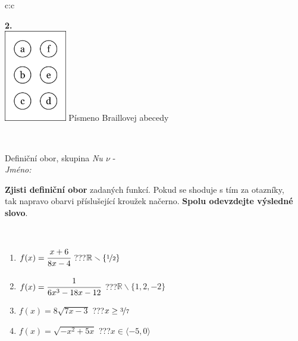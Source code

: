\documentclass[10pt]{report}
\begin{document}
\begin{tabular}{c:c}
\begin{minipage}[c][104.5mm][t]{0.5\linewidth}
\begin{center}
\begin{minipage}{0.20\linewidth}
\begin{center}
{\Huge\bfseries 2.} \\[2mm]
\includegraphics[height=40mm]{../images/braille.png}
{\small Písmeno Braillovej abecedy}
\end{center}
\end{minipage}
\end{center}
\end{minipage}
\\ \hdashline
\begin{minipage}[c][104.5mm][t]{0.5\linewidth}
\begin{center}
\vspace{7mm}
{\huge Definiční obor, skupina \textit{Nu $\nu$} -}\\[5mm]
\textit{Jméno:}\phantom{xxxxxxxxxxxxxxxxxxxxxxxxxxxxxxxxxxxxxxxxxxxxxxxxxxxxxxxxxxxxxxxxx}\\[5mm]
\begin{minipage}{0.95\linewidth}
\begin{center}
\textbf{Zjisti definiční obor} zadaných funkcí. Pokud se shoduje s tím za otazníky,\\tak napravo obarvi příslušející kroužek načerno. \textbf{Spolu odevzdejte výsledné slovo}.
\end{center}
\end{minipage}
\\[1mm]
\begin{minipage}{0.79\linewidth}
\begin{center}
\begin{varwidth}{\linewidth}
\begin{enumerate}
\normalsizerrr
\item $f(x)=\cfrac{x+6}{8x-4}$\quad \dotfill\; ???\;\dotfill \quad $\mathbb{R}\smallsetminus\{\nicefrac{1}{2}\}$
\item $f(x)=\cfrac{1}{6x^3-18x-12}$\quad \dotfill\; ???\;\dotfill \quad $\mathbb{R}\smallsetminus\{1,2,-2\}$
\item $f(x)=8\sqrt{7x-3}$\quad \dotfill\; ???\;\dotfill \quad $x\geq\nicefrac{3}{7}$
\item $f(x)=\sqrt{-x^2+5x}$\quad \dotfill\; ???\;\dotfill \quad $x\in\langle-5 , 0\rangle$

\end{enumerate}
\end{varwidth}
\end{center}
\end{minipage}
\end{center}
\end{minipage}
\end{tabular}
\end{document}
